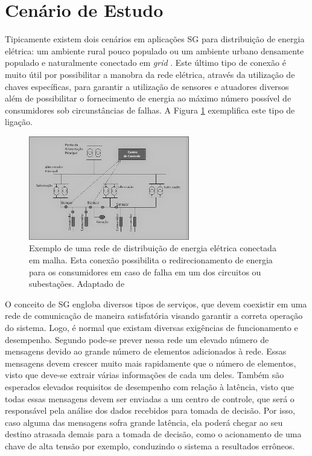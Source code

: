 \documentclass[12pt]{article}
\begin{document}
\section{Cenário de Estudo}
\label{sec:Ambientacao}
Tipicamente existem dois cenários em aplicações SG para distribuição de energia elétrica: um ambiente rural pouco populado ou um ambiente urbano densamente populado e naturalmente conectado em \emph{grid} \cite{Conf_Sood2009}. Este último tipo de conexão é muito útil por possibilitar a manobra da rede elétrica, através da utilização de chaves específicas, para garantir a utilização de sensores e atuadores diversos além de possibilitar o fornecimento de energia ao máximo número possível de consumidores sob circunstâncias de falhas. A Figura \ref{fig_rede_distribuicao} exemplifica este tipo de ligação.

\begin{figure} %
	\centering
	\includegraphics[width=7cm]{Rede_Distribuicao}
	\caption{Exemplo de uma rede de distribuição de energia elétrica conectada em malha. Esta conexão possibilita o redirecionamento de energia para os consumidores em caso de falha em um dos circuitos ou subestações. Adaptado de \cite{Mag_Bouhafs2012}}
	\label{fig_rede_distribuicao}
\end{figure}

O conceito de SG engloba diversos tipos de serviços, que devem coexistir em uma rede de comunicação de maneira satisfatória visando garantir a correta operação do sistema. Logo, é normal que existam diversas exigências de funcionamento e desempenho. Segundo \cite{Art_Aggarwal2010} pode-se prever nessa rede um elevado número de mensagens devido ao grande número de elementos adicionados à rede. Essas mensagens devem crescer muito mais rapidamente que o número de elementos, visto que deve-se extrair várias informações de cada um deles. Também são esperados elevados requisitos de desempenho com relação à latência, visto que todas essas mensagens devem ser enviadas a um centro de controle, que será o responsável pela análise dos dados recebidos para tomada de decisão. Por isso, caso alguma das mensagens sofra grande latência, ela poderá chegar ao seu destino atrasada demais para a tomada de decisão, como o acionamento de uma chave de alta tensão por exemplo, conduzindo o sistema a resultados errôneos.
\end{document}
